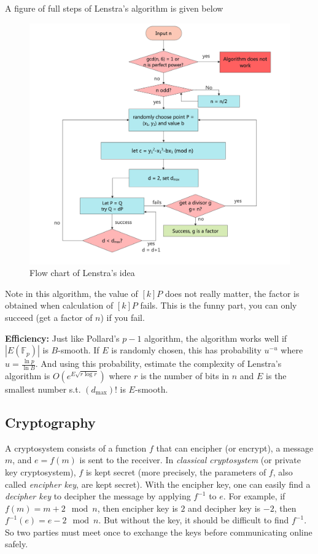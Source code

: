 \documentclass[12pt]{article}
\theoremstyle{remark}
\theoremstyle{definition}
\newcommand{\F}[0]{\mathbb{F}}
\begin{document}
        \newpage
        A figure of full steps of Lenstra's algorithm is given below 
        \begin{figure}[h!]
            \centering
            \includegraphics[scale=0.2]{figures/flow chart.png}
            \caption{Flow chart of Lenstra's idea}
            \label{fig:lenstra}
        \end{figure}
        Note in this algorithm, the value of $[k]P$ does not really matter, the factor is obtained when calculation of $[k]P$ fails. This is the funny part, you can only succeed (get a factor of $n$) if you fail.

        \textbf{Efficiency:} Just like Pollard's $p-1$ algorithm, the algorithm works well if $|E(\F_p)|$ is $B$-smooth. If $E$ is randomly chosen, this has probability $u^{-u}$ where $u = \frac{\ln{p}}{\ln{B}}$. And using this probability, estimate the complexity of Lenstra's algorithm is $O(e^{E\sqrt{r \log{r}}})$ where $r$ is the number of bits in $n$ and $E$ is the smallest number s.t. $(d_{\max})!$ is $E$-smooth.
    
    
    \subsection{Cryptography}
    
    A cryptosystem consists of a function $f$ that can encipher (or encrypt), a message $m$, and $e = f(m)$ is sent to the receiver. In \textit{classical cryptosystem} (or private key cryptosystem), $f$ is kept secret (more precisely, the parameters of $f$, also called \textit{encipher key}, are kept secret). With the encipher key, one can easily find a \textit{decipher key} to decipher the message by applying $f^{-1}$ to $e$. For example, if $f(m) = m + 2 \mod n$, then encipher key is $2$ and decipher key is $-2$, then $f^{-1}(e) = e-2 \mod n$. But without the key, it should be difficult to find $f^{-1}$. So two parties must meet once to exchange the keys before communicating online safely. 
\end{document}

